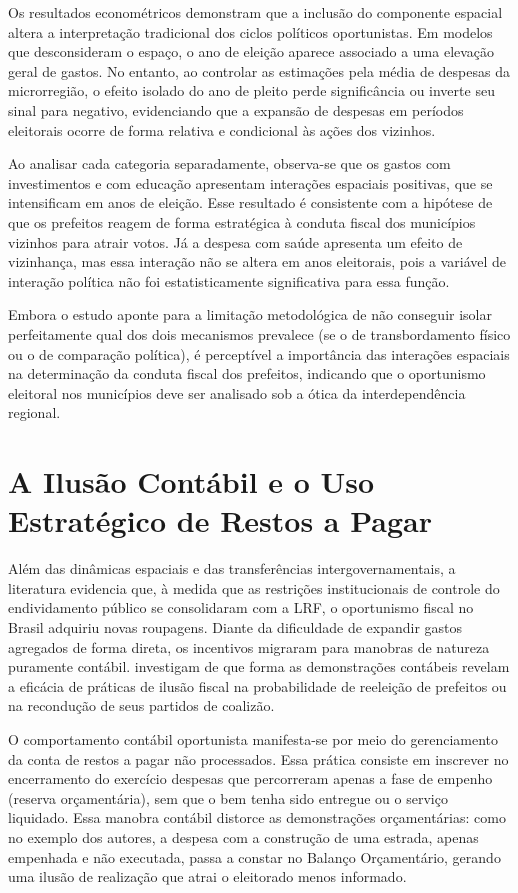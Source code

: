 Os resultados econométricos demonstram que a inclusão do componente espacial altera a interpretação tradicional dos ciclos políticos oportunistas. Em modelos que desconsideram o espaço, o ano de eleição aparece associado a uma elevação geral de gastos. No entanto, ao controlar as estimações pela média de despesas da microrregião, o efeito isolado do ano de pleito perde significância ou inverte seu sinal para negativo, evidenciando que a expansão de despesas em períodos eleitorais ocorre de forma relativa e condicional às ações dos vizinhos.

Ao analisar cada categoria separadamente, observa-se que os gastos com investimentos e com educação apresentam interações espaciais positivas, que se intensificam em anos de eleição. Esse resultado é consistente com a hipótese de que os prefeitos reagem de forma estratégica à conduta fiscal dos municípios vizinhos para atrair votos. Já a despesa com saúde apresenta um efeito de vizinhança, mas essa interação não se altera em anos eleitorais, pois a variável de interação política não foi estatisticamente significativa para essa função.

Embora o estudo aponte para a limitação metodológica de não conseguir isolar perfeitamente qual dos dois mecanismos prevalece (se o de transbordamento físico ou o de comparação política), é perceptível a importância das interações espaciais na determinação da conduta fiscal dos prefeitos, indicando que o oportunismo eleitoral nos municípios deve ser analisado sob a ótica da interdependência regional.

\section{A Ilusão Contábil e o Uso Estratégico de Restos a Pagar}

Além das dinâmicas espaciais e das transferências intergovernamentais, a literatura evidencia que, à medida que as restrições institucionais de controle do endividamento público se consolidaram com a LRF, o oportunismo fiscal no Brasil adquiriu novas roupagens. Diante da dificuldade de expandir gastos agregados de forma direta, os incentivos migraram para manobras de natureza puramente contábil. \textcite{vicente2012} investigam de que forma as demonstrações contábeis revelam a eficácia de práticas de ilusão fiscal na probabilidade de reeleição de prefeitos ou na recondução de seus partidos de coalizão.

O comportamento contábil oportunista manifesta-se por meio do gerenciamento da conta de restos a pagar não processados. Essa prática consiste em inscrever no encerramento do exercício despesas que percorreram apenas a fase de empenho (reserva orçamentária), sem que o bem tenha sido entregue ou o serviço liquidado. Essa manobra contábil distorce as demonstrações orçamentárias: como no exemplo dos autores, a despesa com a construção de uma estrada, apenas empenhada e não executada, passa a constar no Balanço Orçamentário, gerando uma ilusão de realização que atrai o eleitorado menos informado.

